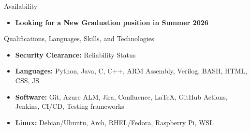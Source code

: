 \documentclass[]{mcdowellcv}
\begin{document}
	\makeheader

	\begin{cvsection}{Availability}
		\begin{cvsubsection}{}{}{}
			\begin{itemize}
				\item \textbf{Looking for a New Graduation position in Summer 2026}
			\end{itemize}
		\end{cvsubsection}
	\end{cvsection}

	\begin{cvsection}{Qualifications, Languages, Skills, and Technologies}
		\begin{cvsubsection}{}{}{}	
			\begin{itemize}
					\item \textbf{Security Clearance:} Reliability Status
					\item \textbf{Languages:} Python, Java, C, C++, ARM Assembly, Verilog, BASH, HTML, CSS, JS
					\item \textbf{Software:} Git, Azure ALM, Jira, Confluence, \LaTeX, GitHub Actions, Jenkins, CI/CD, Testing frameworks
					\item \textbf{Linux:} Debian/Ubuntu, Arch, RHEL/Fedora, Raspberry Pi, WSL
			\end{itemize}
		\end{cvsubsection}
	\end{cvsection}
\end{document}
